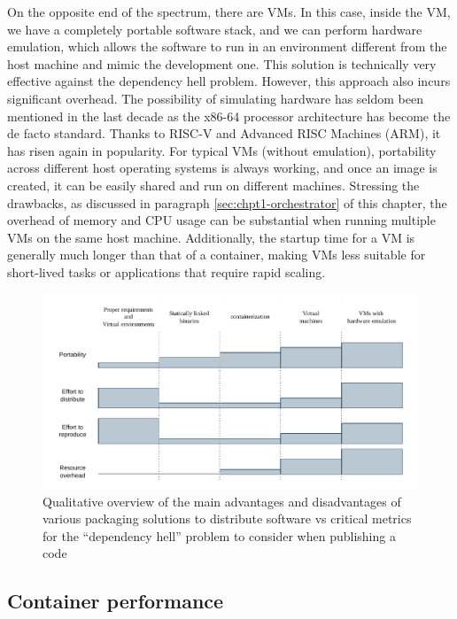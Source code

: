 On the opposite end of the spectrum, there are VMs.
In this case, inside the VM, we have a completely portable software stack, and
we can perform hardware emulation, which allows the software to run in an
environment different from the host machine and mimic the development one.
This solution is technically very effective against the dependency hell problem.
However, this approach also incurs significant overhead.
The possibility of simulating hardware has seldom been mentioned in the last
decade as the x86-64 processor architecture has become the de facto standard.
Thanks to RISC-V and Advanced RISC Machines (ARM), it has risen again in
popularity.
For typical VMs (without emulation), portability across different host operating
systems is always working, and once an image is created, it can be easily shared
and run on different machines.
Stressing the drawbacks, as discussed in paragraph \ref{sec:chpt1-orchestrator}
of this chapter, the overhead of memory and CPU usage can be substantial when
running multiple VMs on the same host machine.
Additionally, the startup time for a VM is generally much longer than that of a
container, making VMs less suitable for short-lived tasks or applications that
require rapid scaling.

\begin{figure}[h]
    \centering
    \includegraphics[width=\textwidth]{img/chpt1/solutions-spectrum}
    \caption{Qualitative overview of the main advantages and disadvantages of
      various packaging solutions to distribute software vs critical metrics for
      the ``dependency hell'' problem to consider when publishing a code}
    \label{fig:solspectrum}
\end{figure}


\subsection{Container performance}

